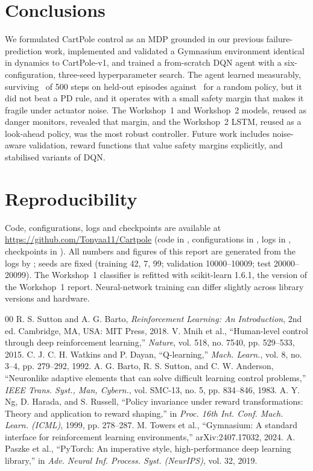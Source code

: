 \documentclass[conference]{IEEEtran}
\begin{document}
\section{Conclusions}
We formulated CartPole control as an MDP grounded in our previous failure-prediction
work, implemented and validated a Gymnasium environment identical in dynamics to
CartPole-v1, and trained a from-scratch DQN agent with a six-configuration,
three-seed hyperparameter search. The agent learned measurably, surviving
\TestDQNMean\ of 500 steps on held-out episodes against \TestRandMean\ for a random
policy, but it did not beat a PD rule, and it operates with a small safety margin that
makes it fragile under actuator noise. The Workshop~1 and Workshop~2 models, reused as
danger monitors, revealed that margin, and the Workshop~2 LSTM, reused as a look-ahead
policy, was the most robust controller. Future work includes noise-aware validation,
reward functions that value safety margins explicitly, and stabilised variants of DQN.

\section*{Reproducibility}
Code, configurations, logs and checkpoints are available at
\url{https://github.com/Tonyaa11/Cartpole} (code in , configurations in
, logs in , checkpoints in
). All numbers and figures of this report are generated
from the logs by ; seeds are fixed (training
42, 7, 99; validation 10000--10009; test 20000--20099). The Workshop~1 classifier is
refitted with scikit-learn 1.6.1, the version of the Workshop~1 report. Neural-network
training can differ slightly across library versions and hardware.

\begin{thebibliography}{00}
 R. S. Sutton and A. G. Barto, \emph{Reinforcement Learning: An Introduction}, 2nd ed. Cambridge, MA, USA: MIT Press, 2018.
 V. Mnih et al., ``Human-level control through deep reinforcement learning,'' \emph{Nature}, vol. 518, no. 7540, pp. 529--533, 2015.
 C. J. C. H. Watkins and P. Dayan, ``Q-learning,'' \emph{Mach. Learn.}, vol. 8, no. 3--4, pp. 279--292, 1992.
 A. G. Barto, R. S. Sutton, and C. W. Anderson, ``Neuronlike adaptive elements that can solve difficult learning control problems,'' \emph{IEEE Trans. Syst., Man, Cybern.}, vol. SMC-13, no. 5, pp. 834--846, 1983.
 A. Y. Ng, D. Harada, and S. Russell, ``Policy invariance under reward transformations: Theory and application to reward shaping,'' in \emph{Proc. 16th Int. Conf. Mach. Learn. (ICML)}, 1999, pp. 278--287.
 M. Towers et al., ``Gymnasium: A standard interface for reinforcement learning environments,'' arXiv:2407.17032, 2024.
 A. Paszke et al., ``PyTorch: An imperative style, high-performance deep learning library,'' in \emph{Adv. Neural Inf. Process. Syst. (NeurIPS)}, vol. 32, 2019.
\end{thebibliography}
\end{document}

